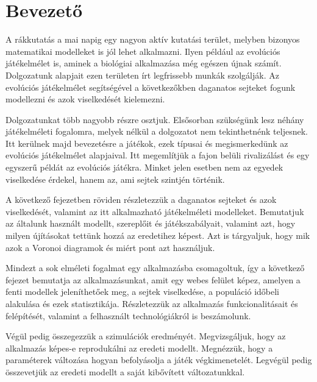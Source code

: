 \chapter{Bevezető}

A rákkutatás a mai napig egy nagyon aktív kutatási terület, melyben bizonyos matematikai modelleket is jól lehet alkalmazni. Ilyen például az evolúciós játékelmélet is, aminek a biológiai alkalmazása még egészen újnak számít. Dolgozatunk alapjait ezen területen írt legfrissebb munkák szolgálják. Az evolúciós játékelmélet segítségével a következőkben daganatos sejteket fogunk  modellezni és azok viselkedését kielemezni.

Dolgozatunkat több nagyobb részre osztjuk. Elsősorban szükségünk lesz néhány játékelméleti fogalomra, melyek nélkül a dolgozatot nem tekinthetnénk teljesnek. Itt kerülnek majd bevezetésre a játékok, ezek típusai és megismerkedünk az evolúciós játékelmélet alapjaival. Itt megemlítjük a fajon belüli rivalizálást és egy egyszerű példát az evolúciós játékra. Minket jelen esetben nem az egyedek viselkedése érdekel, hanem az, ami sejtek szintjén történik.

A következő fejezetben röviden részletezzük a daganatos sejteket és azok viselkedését, valamint az itt alkalmazható játékelméleti modelleket. Bemutatjuk az általunk használt modellt, szereplőit és játékszabályait, valamint azt, hogy milyen újításokat tettünk hozzá az eredetihez képest. Azt is tárgyaljuk, hogy mik azok a Voronoi diagramok és miért pont azt használjuk.

Mindezt a sok elméleti fogalmat egy alkalmazásba csomagoltuk, így a következő fejezet bemutatja az alkalmazásunkat, amit egy webes felület képez, amelyen a fenti modellek jeleníthetőek meg, a sejtek viselkedése, a populáció időbeli alakulása és ezek statisztikája. Részletezzük az alkalmazás funkcionalitásait és felépítését, valamint a felhasznált technológiákról is beszámolunk.

Végül pedig összegezzük a szimulációk eredményét. Megvizsgáljuk, hogy az alkalmazás képes-e reprodukálni az eredeti modellt. Megnézzük, hogy a paraméterek változása hogyan befolyásolja a játék végkimenetelét. Legvégül pedig összevetjük az eredeti modellt a saját kibővített változatunkkal.